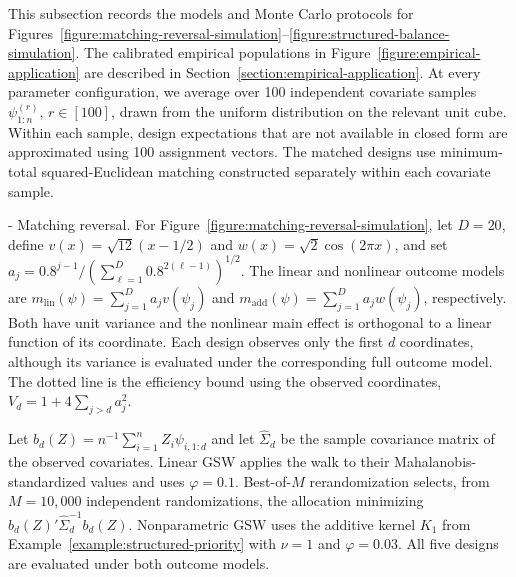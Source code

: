 \documentclass[letterpaper,12pt]{article}
\makeatletter
\theoremstyle{definition}
\numberwithin{equation}{section}
\renewcommand{\paragraph}{\@startsection{paragraph}{4}{\z@}%
  {\medskipamount}%
  {-\fontdimen2\font}%
  {\normalfont\normalsize\bfseries}}
\makeatother
\begin{document}
This subsection records the models and Monte Carlo protocols for Figures~\ref{figure:matching-reversal-simulation}--\ref{figure:structured-balance-simulation}.
The calibrated empirical populations in Figure~\ref{figure:empirical-application} are described in Section~\ref{section:empirical-application}.
At every parameter configuration, we average over 100 independent covariate samples $\psi_{1:n}^{(r)}$, $r\in[100]$, drawn from the uniform distribution on the relevant unit cube.
Within each sample, design expectations that are not available in closed form are approximated using 100 assignment vectors.
The matched designs use minimum-total squared-Euclidean matching constructed separately within each covariate sample.

\paragraph{Matching reversal.}
For Figure~\ref{figure:matching-reversal-simulation}, let $D=20$, define $v(x)=\sqrt{12}(x-1/2)$ and $w(x)=\sqrt{2}\cos(2\pi x)$, and set $a_j=0.8^{j-1}/(\sum_{\ell=1}^{D}0.8^{2(\ell-1)})^{1/2}$.
The linear and nonlinear outcome models are $m_{\mathrm{lin}}(\psi)=\sum_{j=1}^{D}a_jv(\psi_j)$ and $m_{\mathrm{add}}(\psi)=\sum_{j=1}^{D}a_jw(\psi_j)$, respectively.
Both have unit variance and the nonlinear main effect is orthogonal to a linear function of its coordinate.
Each design observes only the first $d$ coordinates, although its variance is evaluated under the corresponding full outcome model.
The dotted line is the efficiency bound using the observed coordinates, $V_d=1+4\sum_{j>d}a_j^2$.

Let $b_d(Z)=n^{-1}\sum_{i=1}^nZ_i\psi_{i,1:d}$ and let $\widehat\Sigma_d$ be the sample covariance matrix of the observed covariates.
Linear GSW applies the walk to their Mahalanobis-standardized values and uses $\varphi=0.1$.
Best-of-$M$ rerandomization selects, from $M=10{,}000$ independent randomizations, the allocation minimizing $b_d(Z)'\widehat\Sigma_d^{-1}b_d(Z)$.
Nonparametric GSW uses the additive kernel $K_1$ from Example~\ref{example:structured-priority} with $\nu=1$ and $\varphi=0.03$.
All five designs are evaluated under both outcome models.
\end{document}
